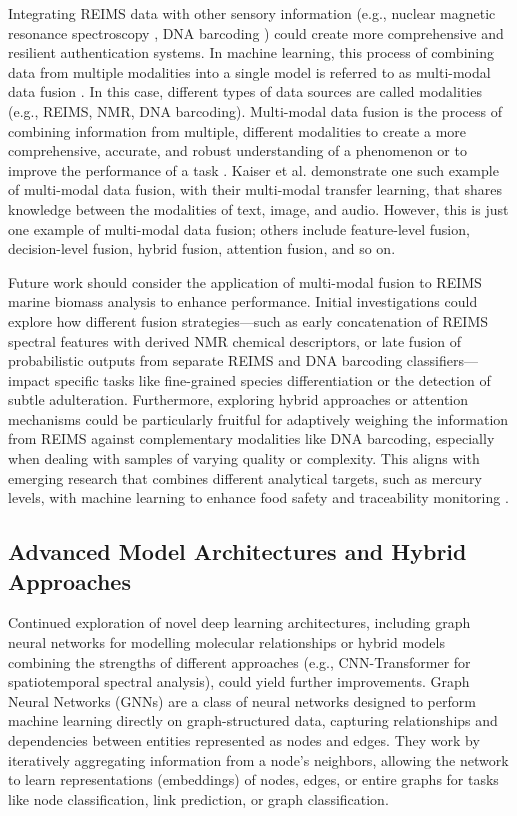Integrating REIMS data with other sensory information (e.g., nuclear magnetic resonance spectroscopy \citep{Bettjeman2018}, DNA barcoding \citep{Khaksar2015}) could create more comprehensive and resilient authentication systems. In machine learning, this process of combining data from multiple modalities into a single model is referred to as multi-modal data fusion \citep{Lahat2015}. In this case, different types of data sources are called modalities (e.g., REIMS, NMR, DNA barcoding). Multi-modal data fusion is the process of combining information from multiple, different modalities to create a more comprehensive, accurate, and robust understanding of a phenomenon or to improve the performance of a task \citep{Zhao2024}. Kaiser et al. \citep{Kaiser2017} demonstrate one such example of multi-modal data fusion, with their multi-modal transfer learning, that shares knowledge between the modalities of text, image, and audio. However, this is just one example of multi-modal data fusion; others include feature-level fusion, decision-level fusion, hybrid fusion, attention fusion, and so on.

Future work should consider the application of multi-modal fusion to REIMS marine biomass analysis to enhance performance.  Initial investigations could explore how different fusion strategies—such as early concatenation of REIMS spectral features with derived NMR chemical descriptors, or late fusion of probabilistic outputs from separate REIMS and DNA barcoding classifiers—impact specific tasks like fine-grained species differentiation or the detection of subtle adulteration. Furthermore, exploring hybrid approaches or attention mechanisms could be particularly fruitful for adaptively weighing the information from REIMS against complementary modalities like DNA barcoding, especially when dealing with samples of varying quality or complexity. This aligns with emerging research that combines different analytical targets, such as mercury levels, with machine learning to enhance food safety and traceability monitoring \citep{Piroutkova2025}.

\subsection{Advanced Model Architectures and Hybrid Approaches}

Continued exploration of novel deep learning architectures, including graph neural networks for modelling molecular relationships or hybrid models combining the strengths of different approaches (e.g., CNN-Transformer \citep{LeCun1989a,Vaswani2017} for spatiotemporal spectral analysis), could yield further improvements.
Graph Neural Networks (GNNs) \citep{Wu2020} are a class of neural networks designed to perform machine learning directly on graph-structured data, capturing relationships and dependencies between entities represented as nodes and edges. They work by iteratively aggregating information from a node's neighbors, allowing the network to learn representations (embeddings) of nodes, edges, or entire graphs for tasks like node classification, link prediction, or graph classification.

